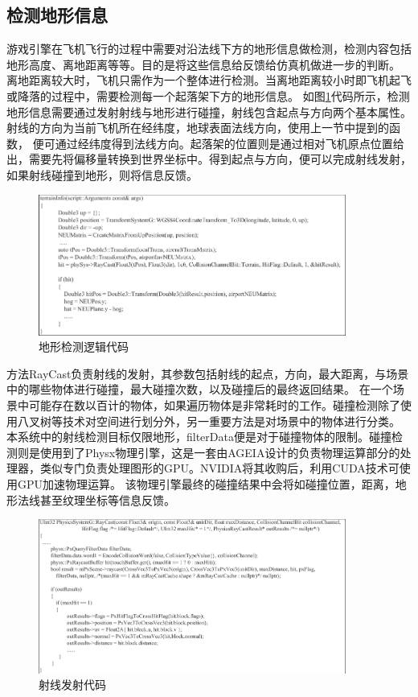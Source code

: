 \subsection{检测地形信息}
游戏引擎在飞机飞行的过程中需要对沿法线下方的地形信息做检测，检测内容包括地形高度、离地距离等等。目的是将这些信息给反馈给仿真机做进一步的判断。
离地距离较大时，飞机只需作为一个整体进行检测。当离地距离较小时即飞机起飞或降落的过程中，需要检测每一个起落架下方的地形信息。
如图\ref{detterrain}代码所示，检测地形信息需要通过发射射线与地形进行碰撞，射线包含起点与方向两个基本属性。射线的方向为当前飞机所在经纬度，地球表面法线方向，使用上一节中提到的函数，
便可通过经纬度得到法线方向。起落架的位置则是通过相对飞机原点位置给出，需要先将偏移量转换到世界坐标中。得到起点与方向，便可以完成射线发射，如果射线碰撞到地形，则将信息反馈。
\begin{figure}[h!]
    \begin{center}
        \includegraphics[width=0.9\textwidth]{pictures/code30.pdf}
        \caption{地形检测逻辑代码}
        \label{detterrain}
    \end{center}
\end{figure}
\par 
方法RayCast负责射线的发射，其参数包括射线的起点，方向，最大距离，与场景中的哪些物体进行碰撞，最大碰撞次数，以及碰撞后的最终返回结果。
在一个场景中可能存在数以百计的物体，如果遍历物体是非常耗时的工作。碰撞检测除了使用八叉树等技术对空间进行划分外，另一重要方法是对场景中的物体进行分类。
本系统中的射线检测目标仅限地形，filterData便是对于碰撞物体的限制。碰撞检测则是使用到了Physx物理引擎，这是一套由AGEIA设计的负责物理运算部分的处理器，类似专门负责处理图形的GPU。NVIDIA将其收购后，利用CUDA技术可使用GPU加速物理运算。
该物理引擎最终的碰撞结果中会将如碰撞位置，距离，地形法线甚至纹理坐标等信息反馈。

\begin{figure}[h!]
    \begin{center}
        \includegraphics[width=0.9\textwidth]{pictures/code29.pdf}
        \caption{射线发射代码}
    \end{center}
\end{figure}
